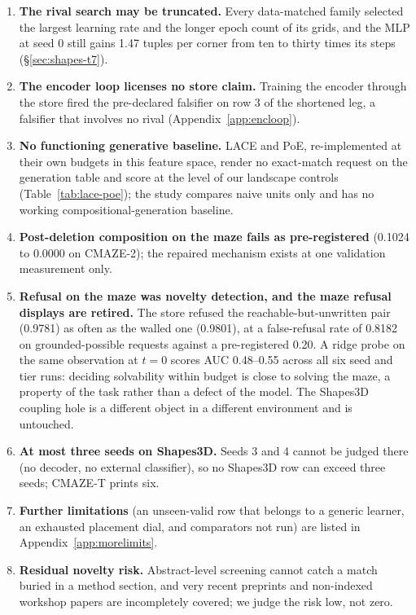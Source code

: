 \documentclass{article} %
\begin{document}
\begin{enumerate}[leftmargin=*,itemsep=1pt]
\item \textbf{The rival search may be truncated.} Every data-matched family selected the largest
  learning rate and the longer epoch count of its grids, and the MLP at seed 0 still gains 1.47 tuples %
  per corner from ten to thirty times its steps (\S\ref{sec:shapes-t7}).
\item \textbf{The encoder loop licenses no store claim.} Training the encoder through the store
  fired the pre-declared falsifier on row 3 of the shortened leg, a falsifier that involves no rival %
  (Appendix~\ref{app:encloop}).
\item \textbf{No functioning generative baseline.} LACE and PoE, re-implemented at their own budgets
  in this feature space, render no exact-match request on the generation table and score at the level
  of our landscape controls (Table~\ref{tab:lace-poe}); the study compares naive units only and has no
  working compositional-generation baseline.
\item \textbf{Post-deletion composition on the maze fails as pre-registered} (0.1024 to 0.0000
  on CMAZE-2); the repaired mechanism exists at one validation measurement only.
\item \textbf{Refusal on the maze was novelty detection, and the maze refusal displays are
  retired.} The store refused the reachable-but-unwritten pair (0.9781) as often as the walled
  one (0.9801), at a false-refusal rate of 0.8182 on grounded-possible requests against a
  pre-registered 0.20. %
  A ridge probe on the same observation at $t=0$ scores AUC 0.48--0.55 across all six seed and
  tier runs: deciding solvability within budget is close to solving the maze, a property of the
  task rather than a defect of the model. %
  The Shapes3D coupling hole is a different object in a different environment and is untouched.
\item \textbf{At most three seeds on Shapes3D.} Seeds 3 and 4 cannot be judged there (no decoder, no
  external classifier), so no Shapes3D row can exceed three seeds; CMAZE-T prints six.
\item \textbf{Further limitations} (an unseen-valid row that belongs to a generic learner, an
  exhausted placement dial, and comparators not run) are listed in Appendix~\ref{app:morelimits}.
\item \textbf{Residual novelty risk.} Abstract-level screening cannot catch a match buried in a
  method section, and very recent preprints and non-indexed workshop papers are incompletely
  covered; we judge the risk low, not zero. %
\end{enumerate}
\end{document}
